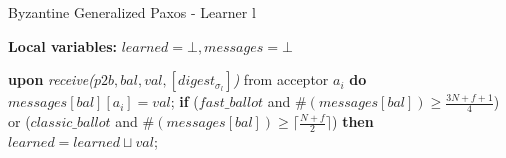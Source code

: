 \begin{algorithm}
	\caption{Byzantine Generalized Paxos - Learner l}
	\textbf{Local variables: } $learned = \bot, messages = \bot$ 
	\begin{algorithmic}[1]
		\State \textbf{upon} \textit{receive($p2b, bal, val, [digest_{\sigma_l}]$)} from acceptor $a_i$ \textbf{do}
		\State \hspace{\algorithmicindent} $messages[bal][a_i] = val$;
		\State \hspace{\algorithmicindent} \textbf{if} {($fast\_ballot$ and $\#(messages[bal]) \geq \frac{3N+f+1}{4}$) or
			\State \hspace{\algorithmicindent} \hspace{\algorithmicindent}	($classic\_ballot$ and $\#(messages[bal]) \geq \lceil \frac{N+f}{2}\rceil$)} \textbf{then}
		\State \hspace{\algorithmicindent} \hspace{\algorithmicindent} \hspace{\algorithmicindent} $learned = learned \sqcup val$;
	\end{algorithmic}
\end{algorithm}
